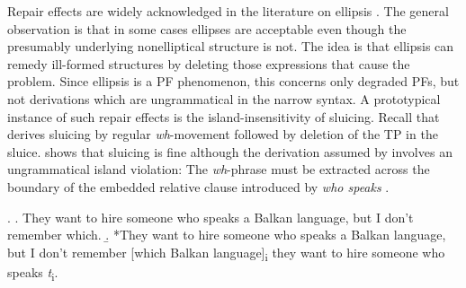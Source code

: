 Repair effects are widely acknowledged in the literature on ellipsis \citep[see e.g.][]{fox.lasnik2003, merchant2008, muller2011, lasnik2015}. The general observation is that in some cases ellipses are acceptable even though the presumably underlying nonelliptical structure is not. The idea is that ellipsis can remedy ill-formed structures by deleting those expressions that cause the problem. Since ellipsis is a PF phenomenon, this concerns only degraded PFs, but not derivations which are ungrammatical in the narrow syntax. A prototypical instance of such repair effects is the island-insensitivity of sluicing. Recall that \citet{merchant2001} derives sluicing by regular \textit{wh}-movement followed by deletion of the TP in the sluice. \Next[a] shows that sluicing is fine although the derivation assumed by \citeauthor{merchant2004} involves an ungrammatical island violation: The \textit{wh}-phrase must be extracted across the boundary of the embedded relative clause introduced by \textit{who speaks} \Next[b].

\ex. \a. They want to hire someone who speaks a Balkan language, but I don't remember which. \hfill\citep[705]{merchant2004}
 \b. *They want to hire someone who speaks a Balkan language, but I don't remember [which Balkan language]\textsubscript{i} they want to hire someone who speaks \textit{t}\textsubscript{i}.
 
